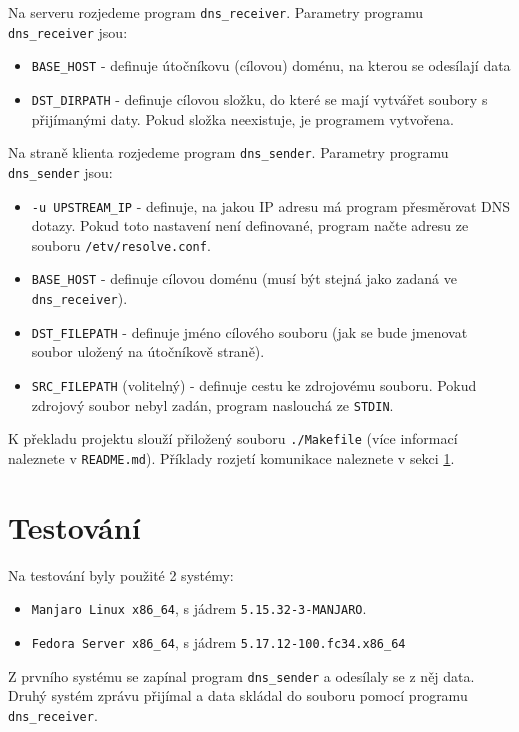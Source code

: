\documentclass[a4paper,11pt]{article}
\begin{document}
    \noindent
    Na serveru rozjedeme program \verb|dns_receiver|. Parametry programu \verb|dns_receiver| jsou:
    \begin{itemize}
        \item \verb|BASE_HOST| \-- definuje útočníkovu (cílovou) doménu, na kterou se odesílají data
        \item \verb|DST_DIRPATH| \-- definuje cílovou složku, do které se mají vytvářet soubory s přijímanými daty.
        Pokud složka neexistuje, je programem vytvořena.
    \end{itemize}

    \noindent
    \label{sec:SenderUsage}
    Na straně klienta rozjedeme program \verb|dns_sender|. Parametry programu \verb|dns_sender| jsou:
    \begin{itemize}
        \item \verb|-u UPSTREAM_IP| \-- definuje, na jakou IP adresu má program přesměrovat DNS dotazy.
        Pokud toto nastavení není definované, program načte adresu ze souboru \verb|/etv/resolve.conf|.
        \item \verb|BASE_HOST| \-- definuje cílovou doménu (musí být stejná jako zadaná ve \verb|dns_receiver|).
        \item \verb|DST_FILEPATH| \-- definuje jméno cílového souboru (jak se bude jmenovat soubor uložený na útočníkově straně).
        \item \verb|SRC_FILEPATH| (volitelný) \-- definuje cestu ke zdrojovému souboru. Pokud zdrojový soubor nebyl zadán,
        program naslouchá ze \verb|STDIN|.
    \end{itemize}

    K překladu projektu slouží přiložený souboru \verb|./Makefile| (více informací naleznete v \verb|README.md|). Příklady rozjetí komunikace naleznete v sekci \ref{sec:testovani}.

    \section{Testování}
    \label{sec:testovani}
    Na testování byly použité 2 systémy:
    \begin{itemize}
        \item \verb|Manjaro Linux x86_64|, s jádrem \verb|5.15.32-3-MANJARO|.
        \item \verb|Fedora Server x86_64|, s jádrem \verb|5.17.12-100.fc34.x86_64|
    \end{itemize}

    Z prvního systému se zapínal program \verb|dns_sender| a odesílaly se z něj data.
    Druhý systém zprávu přijímal a data skládal do souboru pomocí programu \verb|dns_receiver|.
\end{document}
